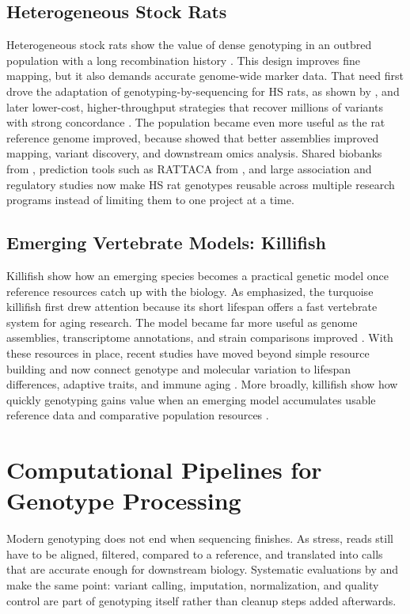 \documentclass{article}
\begin{document}
\subsection{Heterogeneous Stock Rats}
Heterogeneous stock rats show the value of dense genotyping in an outbred population with a long recombination history \parencite{zinski2021genome}. This design improves fine mapping, but it also demands accurate genome-wide marker data. That need first drove the adaptation of genotyping-by-sequencing for HS rats, as shown by \textcite{gileta2020adapting}, and later lower-cost, higher-throughput strategies that recover millions of variants with strong concordance \parencite{chen2025cost}. The population became even more useful as the rat reference genome improved, because \textcite{de2024revamped} showed that better assemblies improved mapping, variant discovery, and downstream omics analysis. Shared biobanks from \textcite{carrette2021cocaine}, prediction tools such as RATTACA from \textcite{johnson2023rattaca}, and large association and regulatory studies \parencite{munro2022regulatory,leal2023genome,kuhn2025genome,tonnele2025genetic} now make HS rat genotypes reusable across multiple research programs instead of limiting them to one project at a time.

\subsection{Emerging Vertebrate Models: Killifish}
Killifish show how an emerging species becomes a practical genetic model once reference resources catch up with the biology. As \textcite{poeschla2020turquoise} emphasized, the turquoise killifish first drew attention because its short lifespan offers a fast vertebrate system for aging research. The model became far more useful as genome assemblies, transcriptome annotations, and strain comparisons improved \parencite{johnson2020draft,johnson2025genome,ayana2025integrating}. With these resources in place, recent studies have moved beyond simple resource building and now connect genotype and molecular variation to lifespan differences, adaptive traits, and immune aging \parencite{mazzetto2025analysis,miller2024independently,morabito2023spontaneous}. More broadly, killifish show how quickly genotyping gains value when an emerging model accumulates usable reference data and comparative population resources \parencite{matthews2020turn}.

\section{Computational Pipelines for Genotype Processing}
Modern genotyping does not end when sequencing finishes. As \textcite{zverinova2022variant} stress, reads still have to be aligned, filtered, compared to a reference, and translated into calls that are accurate enough for downstream biology. Systematic evaluations by \textcite{barbitoff2022systematic} and \textcite{majidian2023genomic} make the same point: variant calling, imputation, normalization, and quality control are part of genotyping itself rather than cleanup steps added afterwards.
\end{document}

